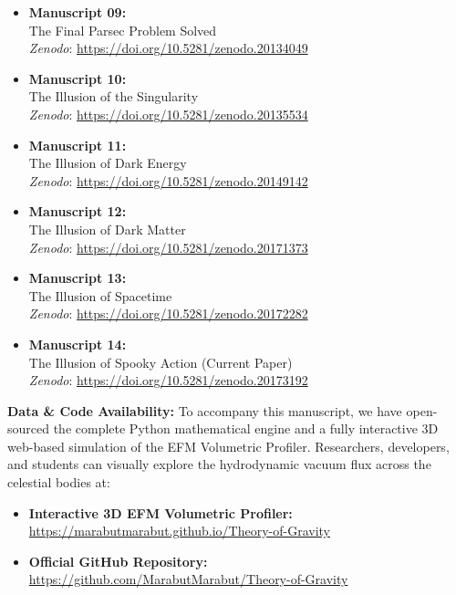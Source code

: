 \documentclass[11pt, a4paper]{article}
\begin{document}
\begin{itemize}
    \item \textbf{Manuscript 09:} \\ The Final Parsec Problem Solved \\ \textit{Zenodo}: \url{https://doi.org/10.5281/zenodo.20134049}

    \item \textbf{Manuscript 10:} \\ The Illusion of the Singularity \\ \textit{Zenodo}: \url{https://doi.org/10.5281/zenodo.20135534}
    
    \item \textbf{Manuscript 11:} \\ The Illusion of Dark Energy \\ \textit{Zenodo}: \url{https://doi.org/10.5281/zenodo.20149142}
    
    \item \textbf{Manuscript 12:} \\ The Illusion of Dark Matter \\ \textit{Zenodo}: \url{https://doi.org/10.5281/zenodo.20171373}

    \item \textbf{Manuscript 13:} \\ The Illusion of Spacetime \\ \textit{Zenodo}: \url{https://doi.org/10.5281/zenodo.20172282}

    \item \textbf{Manuscript 14:} \\ The Illusion of Spooky Action (Current Paper) \\ \textit{Zenodo}: \url{https://doi.org/10.5281/zenodo.20173192}
  \end{itemize}

  \vspace{1em}
  \noindent \textbf{Data \& Code Availability:} To accompany this manuscript, we have open-sourced the complete Python mathematical engine and a fully interactive 3D web-based simulation of the EFM Volumetric Profiler. Researchers, developers, and students can visually explore the hydrodynamic vacuum flux across the celestial bodies at: 
  \begin{itemize}
    \item \textbf{Interactive 3D EFM Volumetric Profiler:} \\ \url{https://marabutmarabut.github.io/Theory-of-Gravity}
    
    \item \textbf{Official GitHub Repository:} \\ \url{https://github.com/MarabutMarabut/Theory-of-Gravity}
  \end{itemize}
\end{document}
